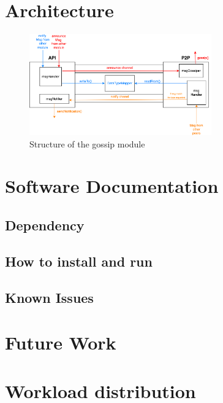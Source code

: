 \section{Architecture}

\begin{figure}[H]
    \centering
    \includegraphics[width=0.7\textwidth]{pics/structure.png}
    \caption{Structure of the gossip module}
\end{figure}

\section{Software Documentation}

\subsection{Dependency}

\subsection{How to install and run}

\subsection{Known Issues}

\section{Future Work}

\section{Workload distribution}

